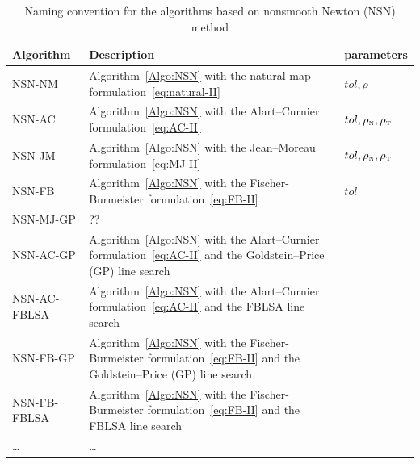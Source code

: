 \begin{table}[htbp]
  \centering
  \begin{tabular}{|l|p{}|l|}
    \hline
    { Algorithm}
    & Description 
    & parameters\\
    \hline
    \sf NSN-NM 
    &  Algorithm~\ref{Algo:NSN} with the natural map formulation~\eqref{eq:natural-II}
    &  $tol, \rho$\\
    \hline
    \sf NSN-AC
    &  Algorithm~\ref{Algo:NSN} with the Alart--Curnier formulation~\eqref{eq:AC-II}
    &  $tol, \rho_{\hbox{\tiny{N}}}, \rho_{\hbox{\tiny{T}}}$\\
    \hline
    \sf NSN-JM 
    &  Algorithm~\ref{Algo:NSN} with the Jean--Moreau formulation~\eqref{eq:MJ-II}
    & $tol, \rho_{\hbox{\tiny{N}}}, \rho_{\hbox{\tiny{T}}}$\\
    \hline
    \sf NSN-FB 
    &  Algorithm~\ref{Algo:NSN} with the Fischer-Burmeister formulation~\eqref{eq:FB-II}
    & $tol$\\
    \hline
    \sf NSN-MJ-GP
    &  ??
    & \\
    \hline
    \sf NSN-AC-GP
    &  Algorithm~\ref{Algo:NSN} with the Alart--Curnier formulation~\eqref{eq:AC-II} and the Goldstein--Price (GP) line search
    & \\
    \hline
    \sf NSN-AC-FBLSA
    &  Algorithm~\ref{Algo:NSN} with the Alart--Curnier formulation~\eqref{eq:AC-II} and the FBLSA line search
    & \\
    \hline
    \sf NSN-FB-GP 
    &  Algorithm~\ref{Algo:NSN} with the Fischer-Burmeister formulation~\eqref{eq:FB-II} and the Goldstein--Price (GP) line search
    & \\
    \hline
    \sf NSN-FB-FBLSA
    &  Algorithm~\ref{Algo:NSN} with the Fischer-Burmeister formulation~\eqref{eq:FB-II} and the  FBLSA line search
    & \\
    \hline
    \sf \ldots 
    &  \ldots
    & \\
    \hline
  \end{tabular}
  \caption{Naming convention for the algorithms based on nonsmooth Newton (NSN) method}
  \label{tab:NSN-algos}
\end{table}

